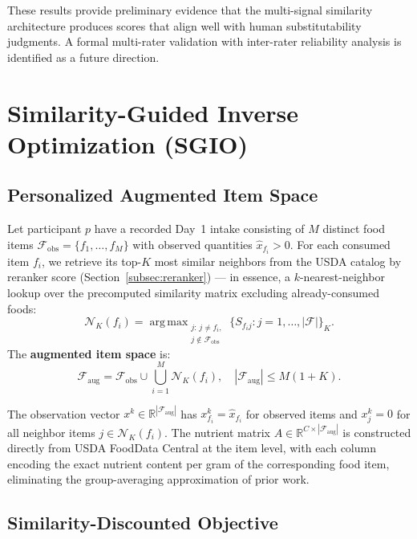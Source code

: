 \documentclass[journal]{IEEEtran}
\DeclareMathOperator*{\argmax}{arg\,max}
\newcommand{\Faug}{\mathcal{F}_{\mathrm{aug}}}
\newcommand{\Fobs}{\mathcal{F}_{\mathrm{obs}}}
\newcommand{\Nb}{\mathcal{N}}
\newcommand{\R}{\mathbb{R}}
\begin{document}
These results provide preliminary evidence that the multi-signal
similarity architecture produces scores that align well with human
substitutability judgments. A formal multi-rater validation with
inter-rater reliability analysis is identified as a future direction.


\section{Similarity-Guided Inverse Optimization (SGIO)}
\label{sec:smgil}

\subsection{Personalized Augmented Item Space}
\label{subsec:augspace}

Let participant $p$ have a recorded Day~1 intake consisting of $M$
distinct food items $\Fobs = \{f_1,\ldots,f_M\}$ with observed
quantities $\hat{x}_{f_i} > 0$. For each consumed item $f_i$, we retrieve its top-$K$ most similar
neighbors from the USDA catalog by reranker score
(Section~\ref{subsec:reranker}) --- in essence, a $k$-nearest-neighbor
lookup over the precomputed similarity matrix excluding already-consumed
foods:
\begin{equation}
\Nb_K(f_i) = \argmax_{\substack{j:\, j \neq f_i,\\ j \notin \Fobs}}
\{S_{f_i j} : j = 1,\ldots,|\mathcal{F}|\}_K.
\label{eq:neighbors}
\end{equation}
The \textbf{augmented item space} is:
\begin{equation}
\Faug = \Fobs \cup \bigcup_{i=1}^M \Nb_K(f_i),
\quad |\Faug| \leq M(1+K).
\label{eq:augspace}
\end{equation}

The observation vector $x^k \in \R^{|\Faug|}$ has $x^k_{f_i} =
\hat{x}_{f_i}$ for observed items and $x^k_j = 0$ for all neighbor
items $j \in \Nb_K(f_i)$. The nutrient matrix $A \in \R^{C \times
|\Faug|}$ is constructed directly from USDA FoodData Central at the
item level, with each column encoding the exact nutrient content per
gram of the corresponding food item, eliminating the group-averaging
approximation of prior work.

\subsection{Similarity-Discounted Objective}
\label{subsec:objective}
\end{document}
